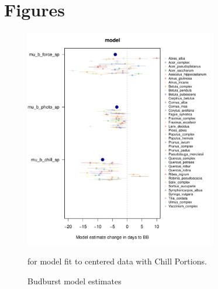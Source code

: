 \documentclass{article}
\begin{document}
\section* {Figures}

\newpage

\begin{figure}[h!]
\centering
\noindent \includegraphics[width=0.75\textwidth]{..//..//analyses/bb_analysis/figures/muplotmodelspcomwcrops_expramp_fpz.pdf}
\caption{Budburst model estimates} for model fit to centered data with Chill Portions. 
\label{fig:mu}
\end{figure}
\end{document}
